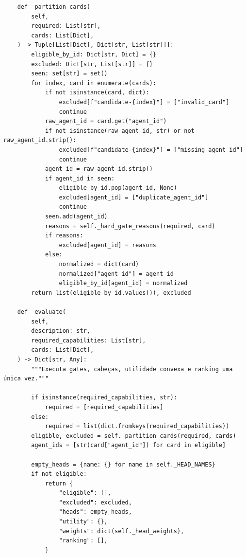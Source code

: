 \documentclass[12pt,openany,oneside,a4paper,brazil,chapter=TITLE]{abntex2}
\begin{document}
\begin{lstlisting}
    def _partition_cards(
        self,
        required: List[str],
        cards: List[Dict],
    ) -> Tuple[List[Dict], Dict[str, List[str]]]:
        eligible_by_id: Dict[str, Dict] = {}
        excluded: Dict[str, List[str]] = {}
        seen: set[str] = set()
        for index, card in enumerate(cards):
            if not isinstance(card, dict):
                excluded[f"candidate-{index}"] = ["invalid_card"]
                continue
            raw_agent_id = card.get("agent_id")
            if not isinstance(raw_agent_id, str) or not raw_agent_id.strip():
                excluded[f"candidate-{index}"] = ["missing_agent_id"]
                continue
            agent_id = raw_agent_id.strip()
            if agent_id in seen:
                eligible_by_id.pop(agent_id, None)
                excluded[agent_id] = ["duplicate_agent_id"]
                continue
            seen.add(agent_id)
            reasons = self._hard_gate_reasons(required, card)
            if reasons:
                excluded[agent_id] = reasons
            else:
                normalized = dict(card)
                normalized["agent_id"] = agent_id
                eligible_by_id[agent_id] = normalized
        return list(eligible_by_id.values()), excluded

    def _evaluate(
        self,
        description: str,
        required_capabilities: List[str],
        cards: List[Dict],
    ) -> Dict[str, Any]:
        """Executa gates, cabeças, utilidade convexa e ranking uma única vez."""

        if isinstance(required_capabilities, str):
            required = [required_capabilities]
        else:
            required = list(dict.fromkeys(required_capabilities))
        eligible, excluded = self._partition_cards(required, cards)
        agent_ids = [str(card["agent_id"]) for card in eligible]

        empty_heads = {name: {} for name in self._HEAD_NAMES}
        if not eligible:
            return {
                "eligible": [],
                "excluded": excluded,
                "heads": empty_heads,
                "utility": {},
                "weights": dict(self._head_weights),
                "ranking": [],
            }


\end{lstlisting}
\end{document}
